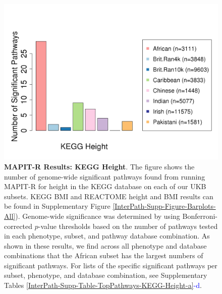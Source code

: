 \documentclass[12pt,a4paper]{article}
\begin{document}
\begin{figure}[htb]
\centering
\includegraphics[scale=.45]{Images/Main/InterPath_Main_Figure_Barplots_KEGGHght_vs1.png}
\caption[TBD]{\textbf{MAPIT-R Results: KEGG Height}. The figure shows the number of genome-wide significant pathways found from running MAPIT-R for height in the KEGG database on each of our UKB subsets. KEGG BMI and REACTOME height and BMI results can be found in Supplementary Figure \ref{InterPath-Supp-Figure-Barplots-All}). Genome-wide significance was determined by using Bonferroni-corrected $p$-value thresholds based on the number of pathways tested in each phenotype, subset, and pathway database combination. As shown in these results, we find across all phenotype and database combinations that the African subset has the largest numbers of significant pathways. For lists of the specific significant pathways per subset, phenotype, and database combination, see Supplementary Tables \ref{InterPath-Supp-Table-TopPathways-KEGG-Height-a}\textcolor{blue}{-d}.}
\label{InterPath-Main-Figure-Barplots-KEGGHght}
\end{figure}
\end{document}
